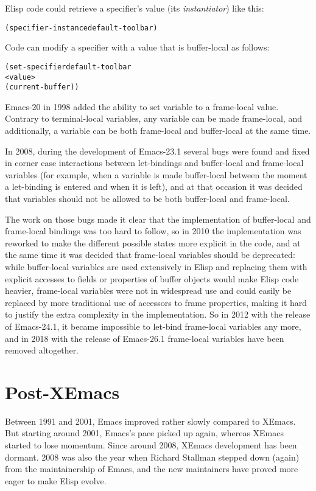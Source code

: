 \documentclass[format=acmsmall, review=false, screen=true]{acmart}
\newcommand \Elisp {Elisp}
\begin{document}
\Elisp{} code could retrieve a specifier's value (its
\emph{instantiator}) like this:
%
\begin{alltt}
(specifier-instance default-toolbar)
\end{alltt}
%
Code can modify a specifier with a value that is buffer-local as
follows:
%
\begin{alltt}
(set-specifier default-toolbar
               <value>
               (current-buffer))
\end{alltt}
%
Emacs-20 in 1998 added the ability to set variable to a frame-local
value.  Contrary to terminal-local variables, any variable can be made
frame-local, and additionally, a variable can be both frame-local and
buffer-local at the same time.

In 2008, during the development of Emacs-23.1 several bugs were found and
fixed in corner case interactions between let-bindings and buffer-local and
frame-local variables (for example, when a variable is made buffer-local
between the moment a let-binding is entered and when it is left), and at
that occasion it was decided that variables should not be allowed to be both
buffer-local and frame-local.

The work on those bugs made it clear that the implementation of buffer-local
and frame-local bindings was too hard to follow, so in 2010 the
implementation was reworked to make the different possible states more
explicit in the code, and at the same time it was decided that frame-local
variables should be deprecated: while buffer-local variables are used
extensively in \Elisp{} and replacing them with explicit accesses to fields
or properties of buffer objects would make \Elisp{} code heavier,
frame-local variables were not in widespread use and could easily be
replaced by more traditional use of accessors to frame properties, making it
hard to justify the extra complexity in the implementation.  So in 2012 with
the release of Emacs-24.1, it became impossible to let-bind frame-local
variables any more, and in 2018 with the release of Emacs-26.1 frame-local
variables have been removed altogether.

\section{Post-XEmacs}           %
\label{sec:post-xemacs}

Between 1991 and 2001, Emacs improved rather slowly compared to XEmacs.
But starting around 2001, Emacs's pace picked up again, whereas XEmacs
started to lose momentum.  Since around 2008, XEmacs development has been
dormant.  2008 was also the year when Richard Stallman stepped down (again)
from the maintainership of Emacs, and the new maintainers have proved more
eager to make \Elisp{} evolve.
\end{document}

